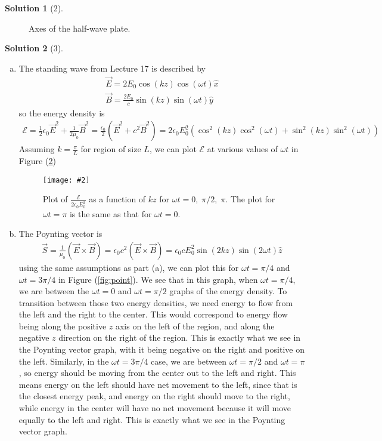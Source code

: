 \documentclass[11pt]{article}
\theoremstyle{definition}
\newtheorem*{solution}{Solution}
\newcommand{\eq}{\begin{equation}\begin{aligned}}
\newcommand{\qe}{\end{aligned}\end{equation}}
\newcommand{\img}[4][0.9\textwidth]{
  \begin{figure}[h]
    \centering
    \texttt{[image: \#2]}
    \caption{#3}
    \label{#4}
  \end{figure}
}
\begin{document}
\begin{solution}[2]
  \begin{figure}
    \centering
    \caption{Axes of the half-wave plate.}
    \label{fig:plate}
  \end{figure}
\end{solution}

\begin{solution}[3]
  \begin{enumerate}[(a)]
    \item The standing wave from Lecture 17 is described by
    \eq
      \vec{E}=2E_0\cos(kz)\cos(\omega t)\hat{x}\\
      \vec{B}=\frac{2E_0}{c}\sin(kz)\sin(\omega t)\hat{y}
    \qe
    so the energy density is
    \eq
      \mathcal{E}=\frac{1}{2}\epsilon_0\vec{E}^2+\frac{1}{2\mu_0}\vec{B}^2=\frac{\epsilon_0}{2}(\vec{E}^2+c^2\vec{B}^2)=2\epsilon_0E_0^2(\cos^2(kz)\cos^2(\omega t)+\sin^2(kz)\sin^2(\omega t))
    \qe
    Assuming $k=\frac{\pi}{L}$ for region of size $L$, we can plot $\mathcal{E}$ at various values of $\omega t$ in Figure (\ref{fig:dens})
    \img{3a}{Plot of $\frac{\mathcal{E}}{2\epsilon_0E_0^2}$ as a function of $kz$ for $\omega t=0,\;\pi/2,\;\pi$. The plot for $\omega t=\pi$ is the same as that for $\omega t=0$.}{fig:dens}
    \item The Poynting vector is
    \eq
      \vec{S}=\frac{1}{\mu_0}(\vec{E}\times\vec{B})=\epsilon_0c^2(\vec{E}\times\vec{B})=\epsilon_0cE_0^2\sin(2kz)\sin(2\omega t)\hat{z}
    \qe
    using the same assumptions as part (a), we can plot this for $\omega t=\pi/4$ and $\omega t=3\pi/4$ in Figure (\ref{fig:point}). We see that in this graph, when $\omega t=\pi/4$, we are between the $\omega t=0$ and $\omega t=\pi/2$ graphs of the energy density. To transition between those two energy densities, we need energy to flow from the left and the right to the center. This would correspond to energy flow being along the positive $z$ axis on the left of the region, and along the negative $z$ direction on the right of the region. This is exactly what we see in the Poynting vector graph, with it being negative on the right and positive on the left. Similarly, in the $\omega t=3\pi/4$ case, we are between $\omega t=\pi/2$ and $\omega t=\pi$, so energy should be moving from the center out to the left and right. This means energy on the left should have net movement to the left, since that is the closest energy peak, and energy on the right should move to the right, while energy in the center will have no net movement because it will move equally to the left and right. This is exactly what we see in the Poynting vector graph.\\

\end{enumerate}
\end{solution}
\end{document}
